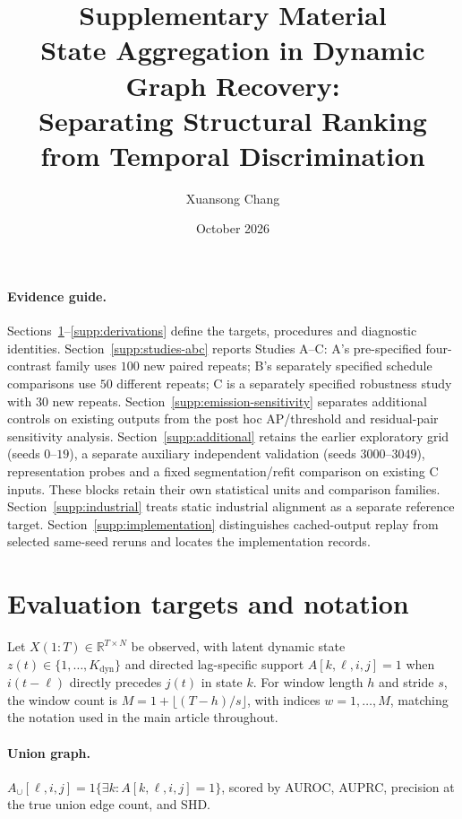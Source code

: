 \documentclass[11pt]{article}
\title{Supplementary Material\\[0.6em]
\large State Aggregation in Dynamic Graph Recovery:\\
Separating Structural Ranking from Temporal Discrimination}
\author{Xuansong Chang}
\date{October 2026}
\newcommand{\kdyn}{K_{\mathrm{dyn}}}
\begin{document}
\maketitle

\paragraph{Evidence guide.}
Sections~\ref{supp:targets}--\ref{supp:derivations} define the targets,
procedures and diagnostic identities. Section~\ref{supp:studies-abc} reports
Studies A--C: A's pre-specified four-contrast family uses $100$ new paired
repeats; B's separately specified schedule comparisons use $50$ different
repeats; C is a separately specified robustness study with $30$ new repeats.
Section~\ref{supp:emission-sensitivity} separates additional controls on existing
outputs from the post hoc AP/threshold and residual-pair sensitivity analysis.
Section~\ref{supp:additional} retains the earlier exploratory grid (seeds
$0$--$19$), a separate auxiliary independent validation (seeds $3000$--$3049$),
representation probes and a fixed segmentation/refit comparison on existing C
inputs. These blocks retain their own statistical units and comparison families.
Section~\ref{supp:industrial} treats static industrial alignment as a separate
reference target. Section~\ref{supp:implementation} distinguishes cached-output
replay from selected same-seed reruns and locates the implementation records.

\FloatBarrier
\section{Evaluation targets and notation}
\label{supp:targets}

\label{sec:problem}

Let $X(1{:}T)\in\mathbb{R}^{T\times N}$ be observed, with latent dynamic state
$z(t)\in\{1,\dots,\kdyn\}$ and directed lag-specific support
$A[k,\ell,i,j]=1$ when $i(t-\ell)$ directly precedes $j(t)$ in state $k$.
For window length $h$ and stride $s$, the window count is
$M=1+\lfloor(T-h)/s\rfloor$, with indices $w=1,\ldots,M$, matching the notation
used in the main article throughout.

\paragraph{Union graph.} $A_{\cup}[\ell,i,j]=1\{\exists k: A[k,\ell,i,j]=1\}$,
scored by AUROC, AUPRC, precision at the true union edge count, and SHD.
\end{document}
